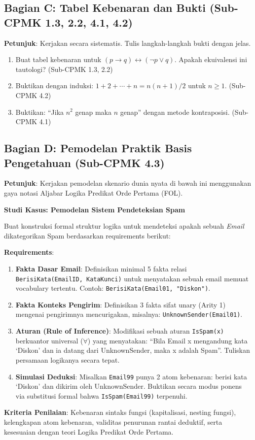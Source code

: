 \subsection{Bagian C: Tabel Kebenaran dan Bukti (Sub-CPMK 1.3, 2.2, 4.1, 4.2)}

\textbf{Petunjuk}: Kerjakan secara sistematis. Tulis langkah-langkah bukti dengan jelas.

\begin{enumerate}
  \item Buat tabel kebenaran untuk $(p \rightarrow q) \leftrightarrow (\neg p \vee q)$. Apakah ekuivalensi ini tautologi? (Sub-CPMK 1.3, 2.2)
  \item Buktikan dengan induksi: $1 + 2 + \cdots + n = n(n+1)/2$ untuk $n \geq 1$. (Sub-CPMK 4.2)
  \item Buktikan: ``Jika $n^2$ genap maka $n$ genap'' dengan metode kontraposisi. (Sub-CPMK 4.1)
\end{enumerate}

\subsection{Bagian D: Pemodelan Praktik Basis Pengetahuan (Sub-CPMK 4.3)}

\textbf{Petunjuk}: Kerjakan pemodelan skenario dunia nyata di bawah ini menggunakan gaya notasi Aljabar Logika Predikat Orde Pertama (FOL).

\textbf{Studi Kasus: Pemodelan Sistem Pendeteksian Spam}

Buat konstruksi formal struktur logika untuk mendeteksi apakah sebuah \textit{Email} dikategorikan Spam berdasarkan requirements berikut:

\textbf{Requirements}:
\begin{enumerate}
  \item \textbf{Fakta Dasar Email}: Definisikan minimal 5 fakta relasi \texttt{BerisiKata(EmailID, KataKunci)} untuk menyatakan sebuah email memuat vocabulary tertentu. Contoh: \texttt{BerisiKata(Email01, "Diskon")}.
  \item \textbf{Fakta Konteks Pengirim}: Definisikan 3 fakta sifat unary (Arity 1) mengenai pengirimnya mencurigakan, misalnya: \texttt{UnknownSender(Email01)}.
  \item \textbf{Aturan (Rule of Inference)}: Modifikasi sebuah aturan \texttt{IsSpam(x)} berkuantor universal ($\forall$) yang menyatakan: ``Bila Email x mengandung kata `Diskon' dan ia datang dari UnknownSender, maka x adalah Spam''. Tuliskan persamaan logikanya secara tepat.
  \item \textbf{Simulasi Deduksi}: Misalkan \texttt{Email99} punya 2 atom kebenaran: berisi kata `Diskon' dan dikirim oleh UnknownSender. Buktikan secara modus ponens via substitusi formal bahwa \texttt{IsSpam(Email99)} terpenuhi.
\end{enumerate}

\textbf{Kriteria Penilaian}: Kebenaran sintaks fungsi (kapitalisasi, nesting fungsi), kelengkapan atom kebenaran, validitas penurunan rantai deduktif, serta kesesuaian dengan teori Logika Predikat Orde Pertama.
